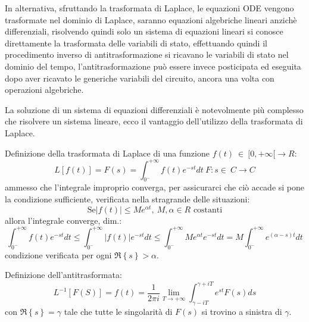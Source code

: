 In alternativa, sfruttando la trasformata di Laplace, le equazioni ODE vengono trasformate nel dominio
di Laplace, saranno equazioni algebriche lineari anzichè differenziali, risolvendo quindi solo un sistema
di equazioni lineari si conosce direttamente la trasformata delle variabili di stato, effettuando quindi
il procedimento inverso di antitrasformazione si ricavano le variabili di stato nel dominio del tempo,
l'antitrasformazione può essere invece posticipata ed eseguita dopo aver ricavato le generiche variabili
del circuito, ancora una volta con operazioni algebriche.

La soluzione di un sistema di equazioni differenziali è notevolmente più complesso che risolvere un 
sistema lineare, ecco il vantaggio dell'utilizzo della trasformata di Laplace.

Definizione della trasformata di Laplace di una funzione $f(t)\ \in\ [0,+\infty[\to R$:
$$
L[f(t)] = F(s) = \int_{0^-}^{+\infty} f(t) e^{-st}dt \ F:s \in\ C \to C
$$
ammesso che l'integrale improprio converga, per assicurarci che ciò accade si pone la condizione sufficiente, verificata nella stragrande delle situazioni:
$$
\text{Se} \left|f(t) \right| \leq Me^{\alpha t} ,\ M,\alpha \in R \text{ costanti}
$$
allora l'integrale converge, dim.:
$$
\int_{0^-}^{+\infty} f(t) e^{-st}dt \leq \int_{0^-}^{+\infty} \left|f(t)\right| e^{-st}dt \leq
\int_{0^-}^{+\infty} Me^{\alpha t} e^{-st}dt = M\int_{0^-}^{+\infty} e^{(\alpha-s)t}dt
$$
condizione verificata per ogni $\Re \left\{ s\right\} > \alpha$.

Definizione dell'antitrasformata:
$$
L^{-1}\left[F(S) \right] = f(t) = \frac{1}{2\pi i} \lim_{T\to+\infty} \int_{\gamma-iT}^{\gamma+iT}
e^{st}F(s)ds
$$
con $\Re\left\{s\right\} = \gamma$ tale che tutte le singolarità di $F(s)$ si trovino a sinistra di $\gamma$.

